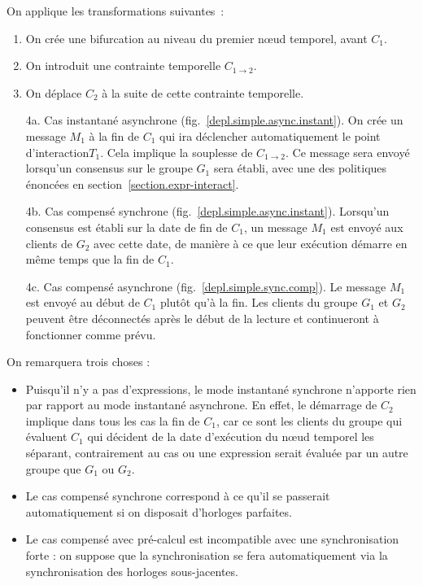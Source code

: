\documentclass{article}
\newcommand\timenode{nœud temporel\xspace}
\newcommand\trigger{point d'interaction\xspace}
\begin{document}
On applique les transformations suivantes~: 
\begin{enumerate}
    \item On crée une bifurcation au niveau du premier \timenode, avant $C_1$.
    \item On introduit une contrainte temporelle $C_{1\rightarrow2}$.
    \item On déplace $C_2$ à la suite de cette contrainte temporelle.
    \item[4a.] Cas instantané asynchrone (fig.~\ref{depl.simple.async.instant}).
    On crée un message $M_1$ à la fin de $C_1$ qui ira déclencher automatiquement le \trigger $T_1$. 
    Cela implique la souplesse de $C_{1\rightarrow2}$.
    Ce message sera envoyé lorsqu'un consensus sur le groupe $G_1$ sera établi, avec une des politiques énoncées en section~\ref{section.expr-interact}.
    \item[4b.] Cas compensé synchrone (fig.~\ref{depl.simple.async.instant}).
    Lorsqu'un consensus est établi sur la date de fin de $C_1$, un message $M_1$ est envoyé aux clients de $G_2$ avec cette date, de manière à ce que leur exécution démarre en même temps que la fin de $C_1$.
    \item[4c.] Cas compensé asynchrone (fig.~\ref{depl.simple.sync.comp}). 
    Le message $M_1$ est envoyé au début de $C_1$ plutôt qu'à la fin.
    Les clients du groupe $G_1$ et $G_2$ peuvent être déconnectés après le début de la lecture et continueront à fonctionner comme prévu.
\end{enumerate}

On remarquera trois choses : 
\begin{itemize}
    \item Puisqu'il n'y a pas d'expressions, le mode instantané synchrone n'apporte rien par rapport au mode instantané asynchrone.
    En effet, le démarrage de $C_2$ implique dans tous les cas la fin de $C_1$, car ce sont les clients du groupe qui évaluent $C_1$ qui décident de la date d'exécution du nœud temporel les séparant, contrairement au cas ou une expression serait évaluée par un autre groupe que $G_1$ ou $G_2$.
    \item Le cas compensé synchrone correspond à ce qu'il se passerait automatiquement si on disposait d'horloges parfaites.
    \item Le cas compensé avec pré-calcul est incompatible avec une synchronisation forte : on suppose que la synchronisation se fera automatiquement via la synchronisation des horloges sous-jacentes.
\end{itemize}
\end{document}
